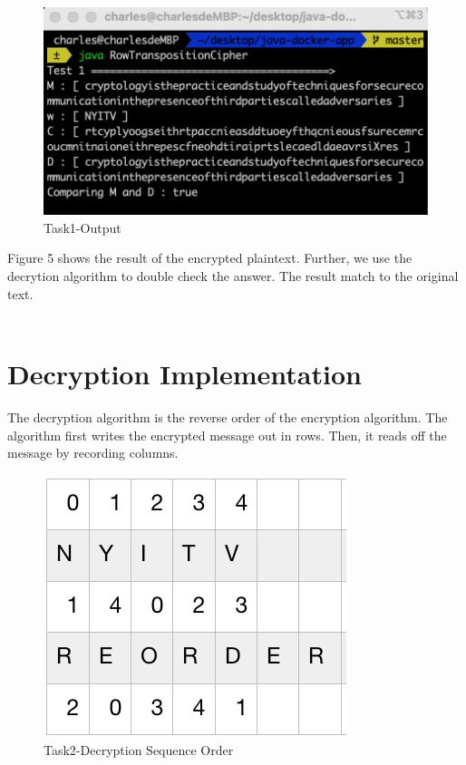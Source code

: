 \documentclass[twoside,twocolumn]{article}
\begin{document}
\begin{figure}[H]
  \centering
  \includegraphics[scale=0.45]{./Graphs/Figure1.6.png}
  \caption{Task1-Output}
  \label{fig:testfig1}
\end{figure}

Figure 5 shows the result of the encrypted plaintext. Further, we use the decrytion algorithm to double check the answer. The result match to the original text.\\ \\ 

\vspace*{-0.35cm}
\section{Decryption Implementation}

The decryption algorithm is the reverse order of the encryption algorithm. The algorithm first writes the encrypted message out in rows. Then, it reads off the message by recording columns. \\

\begin{figure}[H]
  \centering
  \includegraphics[scale=0.65]{./Graphs/Figure1.5.png}
  \caption{Task2-Decryption Sequence Order}
  \label{fig:testfig1}
\end{figure}
\end{document}
